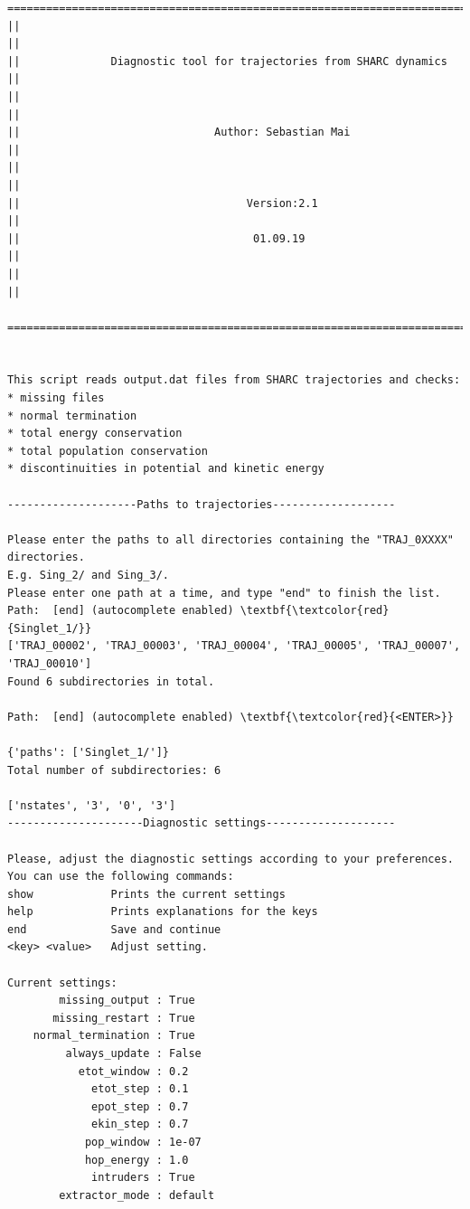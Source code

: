 \documentclass[a4paper,11pt,DIV=15,openany]{scrbook}
\begin{document}
\begin{oframed}
\footnotesize\begin{Verbatim}[commandchars=\\\{\}]
  ================================================================================
||                                                                                ||
||              Diagnostic tool for trajectories from SHARC dynamics              ||
||                                                                                ||
||                              Author: Sebastian Mai                             ||
||                                                                                ||
||                                   Version:2.1                                  ||
||                                    01.09.19                                    ||
||                                                                                ||
  ================================================================================


This script reads output.dat files from SHARC trajectories and checks:
* missing files
* normal termination
* total energy conservation
* total population conservation
* discontinuities in potential and kinetic energy
  
--------------------Paths to trajectories-------------------

Please enter the paths to all directories containing the "TRAJ_0XXXX" directories.
E.g. Sing_2/ and Sing_3/. 
Please enter one path at a time, and type "end" to finish the list.
Path:  [end] (autocomplete enabled) \textbf{\textcolor{red}{Singlet_1/}}
['TRAJ_00002', 'TRAJ_00003', 'TRAJ_00004', 'TRAJ_00005', 'TRAJ_00007', 'TRAJ_00010']
Found 6 subdirectories in total.

Path:  [end] (autocomplete enabled) \textbf{\textcolor{red}{<ENTER>}}

{'paths': ['Singlet_1/']}
Total number of subdirectories: 6

['nstates', '3', '0', '3']
---------------------Diagnostic settings--------------------

Please, adjust the diagnostic settings according to your preferences.
You can use the following commands:
show            Prints the current settings
help            Prints explanations for the keys
end             Save and continue
<key> <value>   Adjust setting.

Current settings:
        missing_output : True
       missing_restart : True
    normal_termination : True
         always_update : False
           etot_window : 0.2
             etot_step : 0.1
             epot_step : 0.7
             ekin_step : 0.7
            pop_window : 1e-07
            hop_energy : 1.0
             intruders : True
        extractor_mode : default


\end{Verbatim}
\end{oframed}
\end{document}
